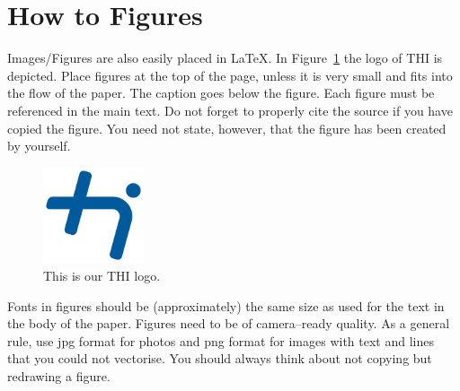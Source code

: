 \section{How to Figures}
Images/Figures are also easily placed in \LaTeX. In Figure~\ref{fig:thilogo} the logo of
THI is depicted.  Place figures at the top of the page, unless it is very small and fits
into the flow of the paper. The caption goes below the figure. Each figure must be
referenced in the main text. Do not forget to properly cite the source if you have copied
the figure. You need not state, however, that the figure has been created by yourself.
\begin{figure}[t]
    \centering \includegraphics[width=8em]{thi_logo_b_RGB.png}
    \caption{This is our THI logo.}     %
    \label{fig:thilogo}
\end{figure}

Fonts in figures should be (approximately) the same size as used for the text in the body
of the paper. Figures need to be of camera--ready quality. As a general rule, use jpg
format for photos and png format for images with text and lines that you could not
vectorise. You should always think about not copying but redrawing a figure. 

